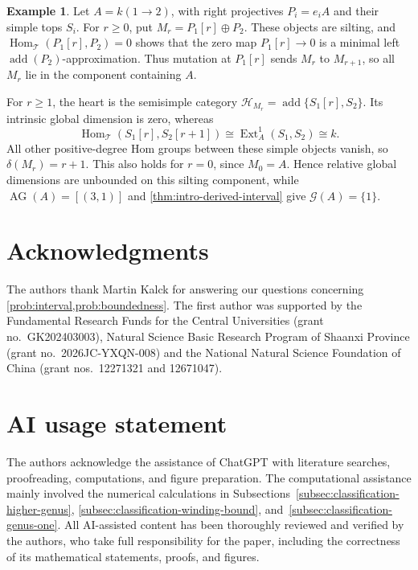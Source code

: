 \documentclass[11pt]{amsart}
\theoremstyle{definition}
\theoremstyle{plain}
\theoremstyle{definition}
\newtheorem{example}[example]{Example}
\theoremstyle{definition}
\newcommand{\Hom}{\operatorname{Hom}}
\newcommand{\AG}{\operatorname{AG}}
\newcommand{\GSpec}{\mathcal G}
\newcommand{\cH}{\mathcal H}
\newcommand{\cT}{\mathcal T}
\newcommand{\Ext}{\operatorname{Ext}}
\begin{document}
\begin{example}
\label{ex:A2-relative-dimension}
Let $A=k(1\longrightarrow2)$, with right projectives
$P_i=e_iA$ and their simple tops $S_i$.
For $r\geq0$, put $M_r=P_1[r]\oplus P_2$.
These objects are silting, and
$\Hom_{\cT}(P_1[r],P_2)=0$ shows that the zero map
$P_1[r]\to0$ is a minimal left
$\operatorname{add}(P_2)$-approximation.
Thus mutation at $P_1[r]$ sends $M_r$ to $M_{r+1}$,
so all $M_r$ lie in the component containing $A$.

For $r\geq1$, the heart is the semisimple category
$\cH_{M_r}=\operatorname{add}\{S_1[r],S_2\}$.
Its intrinsic global dimension is zero, whereas
\[
 \Hom_{\cT}(S_1[r],S_2[r+1])
 \cong\Ext_A^1(S_1,S_2)\cong k.
\]
All other positive-degree Hom groups between these
simple objects vanish, so $\delta(M_r)=r+1$.
This also holds for $r=0$, since $M_0=A$.
Hence relative global dimensions are unbounded on this
silting component, while
$\AG(A)=[(3,1)]$ and
\cref{thm:intro-derived-interval} give
$\GSpec(A)=\{1\}$.
\end{example}
\section*{Acknowledgments}
The authors thank Martin Kalck for answering our questions concerning
\cref{prob:interval,prob:boundedness}.
The first author was supported by the Fundamental Research Funds for the
Central Universities (grant no.~GK202403003), Natural Science Basic Research Program of Shaanxi Province (grant no.~2026JC-YXQN-008) and the National Natural
Science Foundation of China (grant nos.~12271321 and 12671047). 

\section*{AI usage statement}
The authors acknowledge the assistance of ChatGPT with literature
searches, proofreading, computations, and figure preparation.
The computational assistance mainly involved the numerical
calculations in
Subsections~\ref{subsec:classification-higher-genus},
\ref{subsec:classification-winding-bound},
and~\ref{subsec:classification-genus-one}.
All AI-assisted content has been thoroughly reviewed and verified
by the authors, who take full responsibility for the paper,
including the correctness of its mathematical statements,
proofs, and figures.
\end{document}
